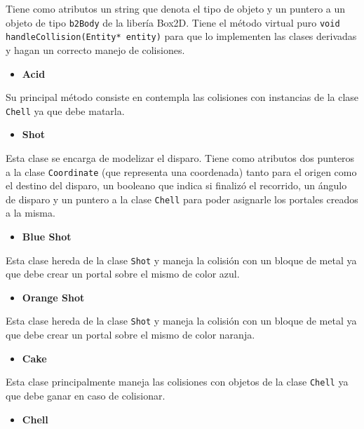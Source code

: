 \documentclass[a4paper]{article}
\begin{document}
Tiene como atributos un string que denota el tipo de objeto y un puntero a un objeto de tipo \texttt{b2Body} de la libería Box2D. Tiene el método virtual puro \texttt{void handleCollision(Entity* entity)} para que lo implementen las clases derivadas y hagan un correcto manejo de colisiones.

\begin{itemize}
	\item \textbf{Acid}
\end{itemize}

Su principal método consiste en contempla las colisiones con instancias de la clase \texttt{Chell} ya que debe matarla.

\begin{itemize}
	\item \textbf{Shot}
\end{itemize}

Esta clase se encarga de modelizar el disparo. Tiene como atributos dos punteros a la clase \texttt{Coordinate} (que representa una coordenada) tanto para el origen como el destino del disparo, un booleano que indica si finalizó el recorrido, un ángulo de disparo y un puntero a la clase \texttt{Chell} para poder asignarle los portales creados a la misma.

\begin{itemize}
	\item \textbf{Blue Shot}
\end{itemize}

Esta clase hereda de la clase \texttt{Shot} y maneja la colisión con un bloque de metal ya que debe crear un portal sobre el mismo de color azul.

\begin{itemize}
	\item \textbf{Orange Shot}
\end{itemize}

Esta clase hereda de la clase \texttt{Shot} y maneja la colisión con un bloque de metal ya que debe crear un portal sobre el mismo de color naranja.

\begin{itemize}
	\item \textbf{Cake}
\end{itemize}

Esta clase principalmente maneja las colisiones con objetos de la clase \texttt{Chell} ya que debe ganar en caso de colisionar.

\begin{itemize}
	\item \textbf{Chell}
\end{itemize}
\end{document}
